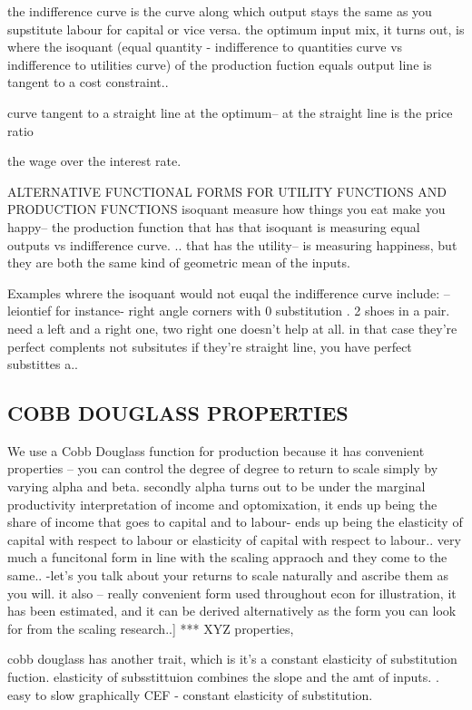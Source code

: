 the indifference curve is the curve along which output stays the same as you supstitute labour for capital or vice versa. 
the optimum input mix, it turns out, is where the isoquant (equal quantity - indifference to quantities curve vs indifference to utilities curve) of the production fuction equals output line is tangent to a cost constraint..

curve tangent to a straight line at the optimum-- at the straight line is the price  ratio

the wage over the interest rate. 

ALTERNATIVE FUNCTIONAL FORMS FOR UTILITY FUNCTIONS AND PRODUCTION FUNCTIONS
isoquant measure how things you eat make you happy-- the production function that has that isoquant is measuring equal outputs
vs indifference curve. .. that has the utility-- is measuring happiness, but they are both the same kind of geometric mean of the inputs. 

Examples whrere the isoquant would not euqal the indifference curve include: -- leiontief for instance- right angle corners with 0 substitution . 2 shoes in a pair. need a left and a right one, two right one doesn't help at all. in that case they're perfect complents not subsitutes
if they're straight line, you have perfect substittes a.. 




\subsection{COBB DOUGLASS PROPERTIES}

We use a Cobb Douglass function for production because it has convenient properties -- you can control the degree of degree to return to scale simply by varying alpha and beta. secondly alpha turns out to be under the marginal productivity interpretation of income and optomixation, it ends up being the share of income that goes to capital and to labour- ends up being the elasticity of capital with respect to labour or elasticity of capital with respect to labour.. very much a funcitonal form in line with the scaling  appraoch and they come to the same.. -let's you talk about your returns to scale naturally and ascribe them as you will. it also -- really convenient form used throughout econ for illustration, it has been estimated, and it can be derived alternatively as the form you can look for from the scaling research..]
*** XYZ properties,

cobb douglass has another trait, which is it's a constant elasticity of substitution fuction.
elasticity of subsstittuion combines the slope and the amt of inputs. . easy to slow graphically CEF - constant elasticity of substitution.




